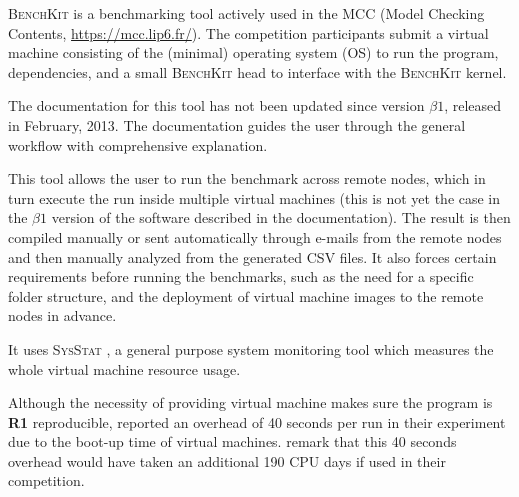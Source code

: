 \textsc{BenchKit} \citep{benchkit:2013} is a benchmarking tool actively used in the MCC (Model Checking Contents, \url{https://mcc.lip6.fr/}).
The competition participants submit a virtual machine consisting of the (minimal) operating system (OS) to run the program, dependencies, and a small \textsc{BenchKit} head to interface with the \textsc{BenchKit} kernel.

The documentation for this tool has not been updated since version $\beta1$, released in February, 2013.
The documentation guides the user through the general workflow with comprehensive explanation.

This tool allows the user to run the benchmark across remote nodes, which in turn execute the run inside multiple virtual machines (this is not yet the case in the $\beta1$ version of the software described in the documentation).
The result is then compiled manually or sent automatically through e-mails from the remote nodes and then manually analyzed from the generated CSV files.
It also forces certain requirements before running the benchmarks, such as the need for a specific folder structure, and the deployment of virtual machine images to the remote nodes in advance.

It uses \textsc{SysStat} \citep{sebastienPerformanceMonitoringTools2019}, a general purpose system monitoring tool which measures the whole virtual machine resource usage.

Although the necessity of providing virtual machine makes sure the program is \textbf{R1} reproducible, \citet{kordonBenchKitToolMassive2014} reported an overhead of 40 seconds per run in their experiment due to the boot-up time of virtual machines.
\cite{beyerReliableBenchmarkingRequirements2019} remark that this 40 seconds overhead would have taken an additional 190 CPU days if used in their competition.


